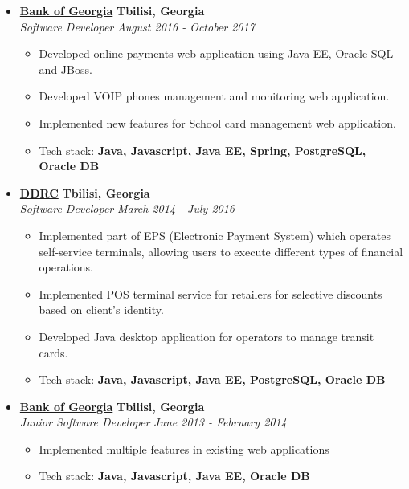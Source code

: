 \documentclass[10pt,letterpaper]{article}
\begin{document}
\begin{itemize}
    \item[]
    {\href{http://bankofgeorgia.ge/en/}{\textbf{Bank of Georgia}} \hfill
      \textbf{Tbilisi, Georgia}}
    \\
    {\emph{Software Developer} \hfill \emph{August 2016 - October 2017}}

    \begin{itemize}[label=\textbullet]
      \itemsep0em
      \item Developed online payments web application using Java EE, Oracle SQL and JBoss.
      \item Developed VOIP phones management and monitoring web application.
      \item Implemented new features for School card management web application.
      \item {Tech stack: \textbf{Java, Javascript, Java EE, Spring, PostgreSQL, Oracle DB}}
      
    \end{itemize}
    \hfill \break

    \item[]
    {\href{https://www.linkedin.com/company/ddrc-didi-digomi-research-center}{\textbf{DDRC}}
\hfill
      \textbf{Tbilisi, Georgia}}
    \\
    {\emph{Software Developer} \hfill \emph{March 2014 - July 2016}}

    \begin{itemize}[label=\textbullet]
      \itemsep0em
      \item Implemented part of EPS (Electronic Payment System) which operates self-service terminals,
allowing users to execute different types of financial operations.
      \item Implemented POS terminal service for retailers for selective discounts based on client's identity.
      \item Developed Java desktop application for operators to manage transit cards.
      \item {Tech stack: \textbf{Java, Javascript, Java EE, PostgreSQL, Oracle DB}}
      
    \end{itemize}
    \hfill \break
    
     \item[]
    {\href{http://bankofgeorgia.ge/en/}{\textbf{Bank of Georgia}} \hfill
      \textbf{Tbilisi, Georgia}}
    \\
    {\emph{Junior Software Developer} \hfill \emph{June 2013 - February 2014}}

    \begin{itemize}[label=\textbullet]
      \itemsep0em
      \item Implemented multiple features in existing web applications
      \item {Tech stack: \textbf{Java, Javascript, Java EE, Oracle DB}}
    \end{itemize}
    
    \end{itemize}
\end{document}

